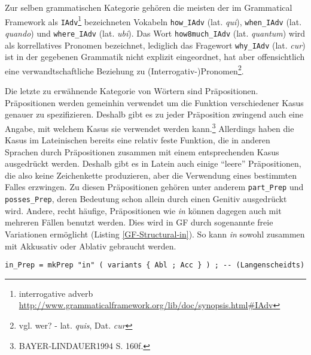 \documentclass[12pt,abstract=on,titlepage,bibliography=totoc,ngerman,listof=totoc]{scrreprt}
\begin{document}
Zur selben grammatischen Kategorie gehören die meisten der im Grammatical Framework als \texttt{IAdv}\footnote{interrogative adverb \url{http://www.grammaticalframework.org/lib/doc/synopsis.html#IAdv}} bezeichneten Vokabeln \texttt{how\_IAdv} (lat. \textit{qui}), \texttt{when\_IAdv} (lat. \textit{quando}) und \texttt{where\_IAdv} (lat. \textit{ubi}). Das Wort \texttt{how8much\_IAdv} (lat. \textit{quantum}) wird als korrellatives Pronomen bezeichnet, lediglich das Fragewort \texttt{why\_IAdv} (lat. \textit{cur}) ist in der gegebenen Grammatik nicht explizit eingeordnet, hat aber offensichtlich eine verwandtschaftliche Beziehung zu (Interrogativ-)Pronomen\footnote {vgl. wer? -  lat. \textit{quis}, Dat. \textit{cur}}.

Die letzte zu erwähnende Kategorie von Wörtern sind Präpositionen. Präpositionen werden gemeinhin verwendet um die Funktion verschiedener Kasus genauer zu spezifizieren. Deshalb gibt es zu jeder Präposition zwingend auch eine Angabe, mit welchem Kasus sie verwendet werden kann.\footnote{BAYER-LINDAUER1994 S. 160f.} Allerdings haben die Kasus im Lateinischen bereits eine relativ feste Funktion, die in anderen Sprachen durch Präpositionen zusammen mit einem entsprechenden Kasus ausgedrückt werden. Deshalb gibt es in Latein auch einige ``leere'' Präpositionen, die also keine Zeichenkette produzieren, aber die Verwendung eines bestimmten Falles erzwingen. Zu diesen Präpositionen gehören unter anderem \texttt{part\_Prep} und \texttt{posses\_Prep}, deren Bedeutung schon allein durch einen Genitiv ausgedrückt wird. Andere, recht häufige, Präpositionen wie \textit{in} können dagegen auch mit mehreren Fällen benutzt werden. Dies wird in GF durch sogenannte freie Variationen ermöglicht (Listing \ref{GF-Structural-in}). So kann \textit{in} sowohl zusammen mit Akkusativ oder Ablativ gebraucht werden.
\begin{lstlisting}[float=ht,label={GF-Structural-in},caption={Beispiel für freie Variation}]
in_Prep = mkPrep "in" ( variants { Abl ; Acc } ) ; -- (Langenscheidts)
\end{lstlisting}

\FloatBarrier
\end{document}
